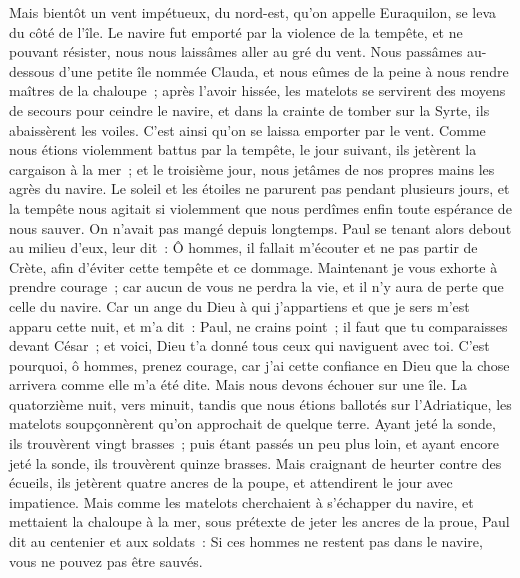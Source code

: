 \begin{multicols}{2}
Mais bientôt un vent impétueux, du nord-est, qu'on appelle Euraquilon, se leva du côté de l'île.
Le navire fut emporté par la violence de la tempête, et ne pouvant résister, nous nous laissâmes aller au gré du vent.
Nous passâmes au-dessous d'une petite île nommée Clauda, et nous eûmes de la peine à nous rendre maîtres de la chaloupe~;
après l'avoir hissée, les matelots se servirent des moyens de secours pour ceindre le navire, et dans la crainte de tomber sur la Syrte, ils abaissèrent les voiles. C'est ainsi qu'on se laissa emporter par le vent.
Comme nous étions violemment battus par la tempête, le jour suivant, ils jetèrent la cargaison à la mer~;
et le troisième jour, nous jetâmes de nos propres mains les agrès du navire.
Le soleil et les étoiles ne parurent pas pendant plusieurs jours, et la tempête nous agitait si violemment que nous perdîmes enfin toute espérance de nous sauver.
On n'avait pas mangé depuis longtemps. Paul se tenant alors debout au milieu d'eux, leur dit~: Ô hommes, il fallait m'écouter et ne pas partir de Crète, afin d'éviter cette tempête et ce dommage.
Maintenant je vous exhorte à prendre courage~; car aucun de vous ne perdra la vie, et il n'y aura de perte que celle du navire.
Car un ange du Dieu à qui j'appartiens et que je sers m'est apparu cette nuit,
et m'a dit~: Paul, ne crains point~; il faut que tu comparaisses devant César~; et voici, Dieu t'a donné tous ceux qui naviguent avec toi.
C'est pourquoi, ô hommes, prenez courage, car j'ai cette confiance en Dieu que la chose arrivera comme elle m'a été dite.
Mais nous devons échouer sur une île.
La quatorzième nuit, vers minuit, tandis que nous étions ballotés sur l'Adriatique, les matelots soupçonnèrent qu'on approchait de quelque terre.
Ayant jeté la sonde, ils trouvèrent vingt brasses~; puis étant passés un peu plus loin, et ayant encore jeté la sonde, ils trouvèrent quinze brasses.
Mais craignant de heurter contre des écueils, ils jetèrent quatre ancres de la poupe, et attendirent le jour avec impatience.
Mais comme les matelots cherchaient à s'échapper du navire, et mettaient la chaloupe à la mer, sous prétexte de jeter les ancres de la proue,
Paul dit au centenier et aux soldats~: Si ces hommes ne restent pas dans le navire, vous ne pouvez pas être sauvés.

\end{multicols}
